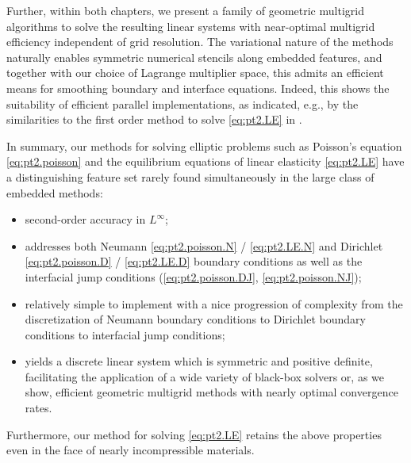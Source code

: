 Further, within both chapters, we present a family of geometric multigrid algorithms to solve the resulting linear systems with near-optimal multigrid efficiency independent of grid resolution. The variational nature of the methods naturally enables symmetric numerical stencils along embedded features, and together with our choice of Lagrange multiplier space, this admits an efficient means for smoothing boundary and interface equations. Indeed, this shows the suitability of efficient parallel implementations, as indicated, e.g., by the similarities to the first order method to solve \eqref{eq:pt2.LE} in \cite{Zhu.Yongning10}.

In summary, our methods for solving elliptic problems such as Poisson's equation \eqref{eq:pt2.poisson} and the equilibrium equations of linear elasticity \eqref{eq:pt2.LE} have a distinguishing feature set rarely found simultaneously in the large class of embedded methods:
\begin{itemize}
\item second-order accuracy in $L^{\infty}$;
\item addresses both Neumann \eqref{eq:pt2.poisson.N} / \eqref{eq:pt2.LE.N} and Dirichlet \eqref{eq:pt2.poisson.D} / \eqref{eq:pt2.LE.D} boundary conditions as well as the interfacial jump conditions (\ref{eq:pt2.poisson.DJ}, \ref{eq:pt2.poisson.NJ});
\item relatively simple to implement with a nice progression of complexity from the discretization of Neumann boundary conditions to Dirichlet boundary conditions to interfacial jump conditions;
\item yields a discrete linear system which is symmetric and positive definite, facilitating the application of a wide variety of black-box solvers or, as we show, efficient geometric multigrid methods with nearly optimal convergence rates.
\end{itemize}
Furthermore, our method for solving \eqref{eq:pt2.LE} retains the above properties even in the face of nearly incompressible materials.

\renewcommand{\thechapter}{\arabic{chapter}}
